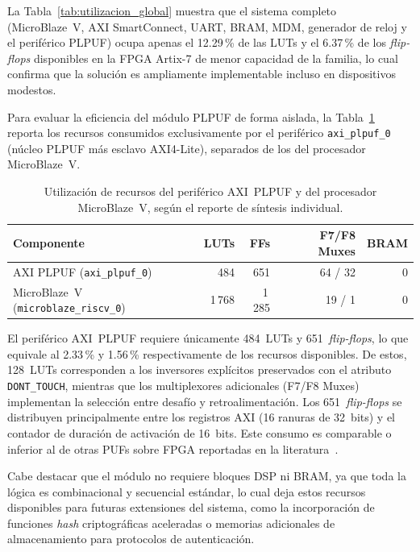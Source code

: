 La Tabla~\ref{tab:utilizacion_global} muestra que el sistema completo
(MicroBlaze~V, AXI SmartConnect, UART, BRAM, MDM, generador de reloj y el
periférico PLPUF) ocupa apenas el 12.29\,\% de las LUTs y el 6.37\,\% de los
\textit{flip-flops} disponibles en la FPGA Artix-7 de menor capacidad de la
familia, lo cual confirma que la solución es ampliamente
implementable incluso en dispositivos modestos.

Para evaluar la eficiencia del módulo PLPUF de forma aislada, la
Tabla~\ref{tab:utilizacion_plpuf} reporta los recursos consumidos
exclusivamente por el periférico \texttt{axi\_plpuf\_0} (núcleo PLPUF más
esclavo AXI4-Lite), separados de los del procesador MicroBlaze~V.

\begin{table}[htbp]
\centering
\caption{Utilización de recursos del periférico AXI~PLPUF y del procesador
  MicroBlaze~V, según el reporte de síntesis individual.}
\label{tab:utilizacion_plpuf}
\small
\renewcommand{\arraystretch}{1.2}
\begin{tabular}{lrrrr}
\hline
\textbf{Componente} & \textbf{LUTs} & \textbf{FFs} & \textbf{F7/F8 Muxes} & \textbf{BRAM} \\
\hline
AXI PLPUF (\texttt{axi\_plpuf\_0})       & 484    & 651    & 64 / 32 & 0  \\
MicroBlaze~V (\texttt{microblaze\_riscv\_0}) & 1\,768 & 1\,285 & 19 / 1  & 0  \\
\hline
\end{tabular}
\end{table}

El periférico AXI~PLPUF requiere únicamente 484~LUTs y 651~\textit{flip-flops},
lo que equivale al 2.33\,\% y 1.56\,\% respectivamente de los recursos
disponibles. De estos, 128~LUTs corresponden a los inversores explícitos
preservados con el atributo \texttt{DONT\_TOUCH}, mientras que los
multiplexores adicionales (F7/F8 Muxes) implementan la selección entre
desafío y retroalimentación. Los 651~\textit{flip-flops} se distribuyen
principalmente entre los registros AXI (16 ranuras de 32~bits) y el
contador de duración de activación de 16~bits. Este consumo es comparable o
inferior al de otras PUFs sobre FPGA reportadas en la
literatura~\cite{hou_2019_lightweight, srilakshmi_2023_puf_lfsr,
lata_2023_fpgapuf}.

Cabe destacar que el módulo no requiere bloques DSP ni BRAM, ya que toda la
lógica es combinacional y secuencial estándar, lo cual deja estos recursos
disponibles para futuras extensiones del sistema, como la incorporación de
funciones \textit{hash} criptográficas aceleradas o memorias adicionales de
almacenamiento para protocolos de autenticación.

